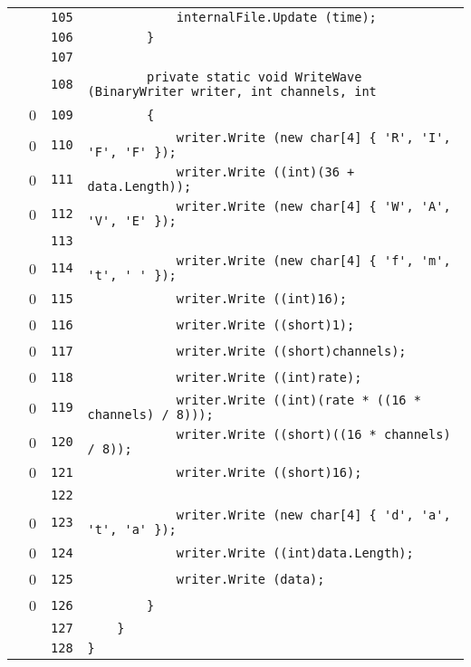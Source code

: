 \documentclass[a4paper,10pt]{article}
\begin{document}
\begin{longtable}[l]{lrrl}
\cellcolor{gray} &  & \verb~105~ & \verb~            internalFile.Update (time);~\\
\cellcolor{gray} &  & \verb~106~ & \verb~        }~\\
\cellcolor{gray} &  & \verb~107~ & \verb~~\\
\cellcolor{gray} &  & \verb~108~ & \verb~        private static void WriteWave (BinaryWriter writer, int channels, int ~\\
\cellcolor{red} & 0 & \verb~109~ & \verb~        {~\\
\cellcolor{red} & 0 & \verb~110~ & \verb~            writer.Write (new char[4] { 'R', 'I', 'F', 'F' });~\\
\cellcolor{red} & 0 & \verb~111~ & \verb~            writer.Write ((int)(36 + data.Length));~\\
\cellcolor{red} & 0 & \verb~112~ & \verb~            writer.Write (new char[4] { 'W', 'A', 'V', 'E' });~\\
\cellcolor{gray} &  & \verb~113~ & \verb~~\\
\cellcolor{red} & 0 & \verb~114~ & \verb~            writer.Write (new char[4] { 'f', 'm', 't', ' ' });~\\
\cellcolor{red} & 0 & \verb~115~ & \verb~            writer.Write ((int)16);~\\
\cellcolor{red} & 0 & \verb~116~ & \verb~            writer.Write ((short)1);~\\
\cellcolor{red} & 0 & \verb~117~ & \verb~            writer.Write ((short)channels);~\\
\cellcolor{red} & 0 & \verb~118~ & \verb~            writer.Write ((int)rate);~\\
\cellcolor{red} & 0 & \verb~119~ & \verb~            writer.Write ((int)(rate * ((16 * channels) / 8)));~\\
\cellcolor{red} & 0 & \verb~120~ & \verb~            writer.Write ((short)((16 * channels) / 8));~\\
\cellcolor{red} & 0 & \verb~121~ & \verb~            writer.Write ((short)16);~\\
\cellcolor{gray} &  & \verb~122~ & \verb~~\\
\cellcolor{red} & 0 & \verb~123~ & \verb~            writer.Write (new char[4] { 'd', 'a', 't', 'a' });~\\
\cellcolor{red} & 0 & \verb~124~ & \verb~            writer.Write ((int)data.Length);~\\
\cellcolor{red} & 0 & \verb~125~ & \verb~            writer.Write (data);~\\
\cellcolor{red} & 0 & \verb~126~ & \verb~        }~\\
\cellcolor{gray} &  & \verb~127~ & \verb~    }~\\
\cellcolor{gray} &  & \verb~128~ & \verb~}~\\
\end{longtable}
\newpage
\end{document}
